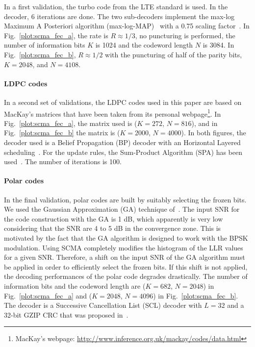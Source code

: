 In a first validation, the turbo code from the LTE standard is used. In the
decoder, 6 iterations are done. The two sub-decoders implement the max-log
Maximum A Posteriori algorithm (max-log-MAP)~\cite{Robertson1995} with a 0.75
scaling factor~\cite{Vogt2000}. In Fig.~\ref{plot:scma_fec_a}, the rate is
$R \approx 1/3$, no puncturing is performed, the number of information bits
$K$ is 1024 and the codeword length $N$ is 3084. In Fig.~\ref{plot:scma_fec_b},
$R \approx 1/2$ with the puncturing of half of the parity bits,
$K=2048$, and $N=4108$.

\paragraph{LDPC codes}

In a second set of validations, the LDPC codes used in this paper are based on
MacKay's matrices that have been taken from its personal
webpage\footnote{MacKay's webpage: \url{http://www.inference.org.uk/mackay/codes/data.html}}.
In Fig.~\ref{plot:scma_fec_a}, the matrix used is ($K=272$, $N=816$), and in
Fig.~\ref{plot:scma_fec_b} the matrix is ($K=2000$, $N=4000$). In both figures,
the decoder used is a Belief Propagation (BP) decoder with an Horizontal Layered
scheduling~\cite{Yeo2001}. For the update rules, the Sum-Product Algorithm (SPA)
has been used~\cite{MacKay1999}. The number of iterations is 100.

\paragraph{Polar codes}

In the final validation, polar codes are built by suitably selecting the frozen
bits. We used the Gaussian Approximation (GA) technique of~\cite{Trifonov2012}.
The input SNR for the code construction with the GA is 1 dB, which apparently is
very low considering that the SNR are 4 to 5 dB in the convergence zone. This is
motivated by the fact that the GA algorithm is designed to work with the BPSK
modulation. Using SCMA completely modifies the histogram of the LLR values for a
given SNR. Therefore, a shift on the input SNR of the GA algorithm must be
applied in order to efficiently select the frozen bits. If this shift is
not applied, the decoding performances of the polar code degrades drastically.
The number of information bits and the codeword length are ($K=682$, $N=2048$)
in Fig.~\ref{plot:scma_fec_a} and ($K=2048$, $N=4096$) in
Fig.~\ref{plot:scma_fec_b}. The decoder is a Successive Cancellation List (SCL)
decoder with $L=32$ and a 32-bit GZIP CRC that was proposed
in~\cite{Leonardon2019}.

